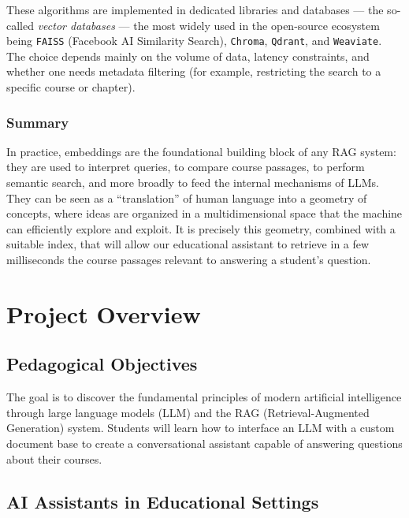 \documentclass[a4paper,11pt]{article}
\begin{document}
These algorithms are implemented in dedicated libraries and databases
--- the so-called \emph{vector databases} --- the most widely used in the
open-source ecosystem being \texttt{FAISS} (Facebook AI Similarity
Search), \texttt{Chroma}, \texttt{Qdrant}, and \texttt{Weaviate}. The
choice depends mainly on the volume of data, latency constraints, and
whether one needs metadata filtering (for example, restricting the search
to a specific course or chapter).

\subsubsection{Summary}

In practice, embeddings are the foundational building block of any RAG
system: they are used to interpret queries, to compare course passages, to
perform semantic search, and more broadly to feed the internal mechanisms
of LLMs. They can be seen as a ``translation'' of human language into a
geometry of concepts, where ideas are organized in a multidimensional
space that the machine can efficiently explore and exploit. It is
precisely this geometry, combined with a suitable index, that will allow
our educational assistant to retrieve in a few milliseconds the course
passages relevant to answering a student's question.

\newpage
\section{Project Overview}

\subsection{Pedagogical Objectives}
The goal is to discover the fundamental principles of modern artificial intelligence through
large language models (LLM) and the RAG (Retrieval-Augmented Generation) system.
Students will learn how to interface an LLM with a custom document base to create
a conversational assistant capable of answering questions about their courses.
\subsection{AI Assistants in Educational Settings}
 
\end{document}
